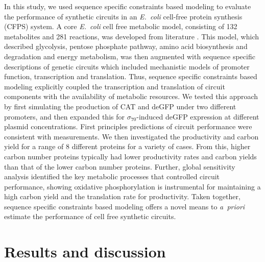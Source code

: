 \documentclass[journal=asbcd6,manuscript=article]{achemso}
\begin{document}
In this study, we used sequence specific constraints based modeling to evaluate the performance of synthetic circuits in an \emph{E.~coli} cell-free protein synthesis (CFPS) system.
A core \emph{E.~coli} cell free metabolic model, consisting of 132 metabolites and 281 reactions, was developed from literature \cite{Feist:2007aa}.
This model, which described glycolysis, pentose phosphate pathway, amino acid biosynthesis and degradation and energy metabolism, was then augmented with
sequence specific descriptions of genetic circuits which included mechanistic models of promoter function, transcription and translation.
Thus, sequence specific constraints based modeling explicitly coupled the transcription and translation of circuit components with the availability of metabolic resources.
We tested this approach by first simulating the production of CAT and deGFP under two different promoters, and then expanded this for $\sigma_{70}$-induced deGFP expression at different plasmid concentrations.
First principles predictions of circuit performance were consistent with measurements.
We then investigated the productivity and carbon yield for a range of 8 different proteins for a variety of cases.
From this, higher carbon number proteins typically had lower productivity rates and carbon yields than that of the lower carbon number proteins.
Further, global sensitivity analysis identified the key metabolic processes that controlled circuit performance, showing oxidative phosphorylation is instrumental for maintaining a high carbon yield and the translation rate for productivity.
Taken together, sequence specific constraints based modeling offers a novel means to \emph{a~priori} estimate the performance of cell free synthetic circuits.

\section{Results and discussion}
\end{document}
